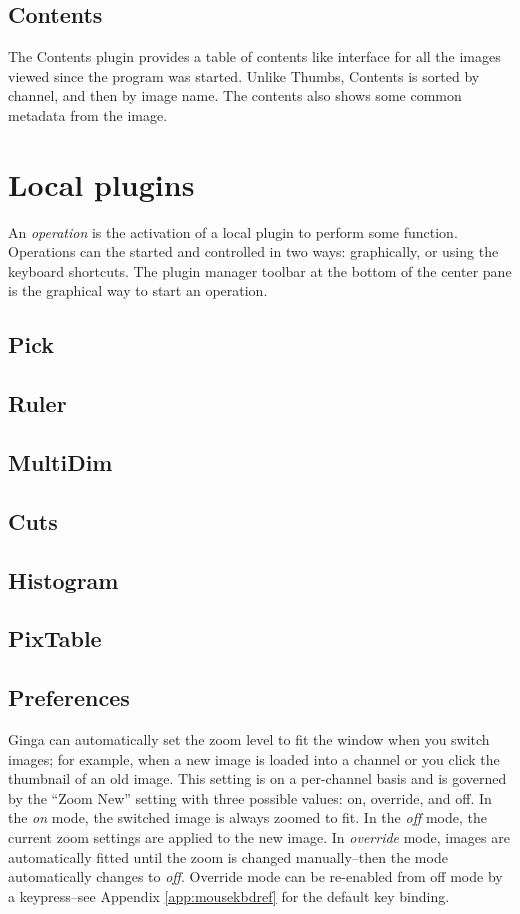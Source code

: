 \documentclass[11pt]{report}
\begin{document}
\subsection{Contents}
The Contents plugin provides a table of contents like interface for all
the images viewed since the program was started.  Unlike Thumbs,
Contents is sorted by channel, and then by image name.  The contents
also shows some common metadata from the image.

\section{Local plugins}

An {\em operation} is the activation of a local plugin to perform some
function.  Operations can the started and controlled in two ways:
graphically, or using the keyboard shortcuts.  The plugin manager
toolbar at the bottom of the center pane is the graphical way to start
an operation.  


\subsection{Pick}
\subsection{Ruler}
\subsection{MultiDim}
\subsection{Cuts}
\subsection{Histogram}
\subsection{PixTable}
\subsection{Preferences}

\label{pref:autozoom}
Ginga can automatically set the zoom level to fit the window when you
switch images; 
for example, when a new image is loaded into a channel or you click the
thumbnail of an old image.
This setting is on a per-channel basis and is governed by the ``Zoom
New'' setting with three possible values: on, override, and off.  
In the \emph{on} mode, the switched image is always zoomed to fit.  In the 
\emph{off} mode, the current zoom settings are applied to the new image.
In \emph{override} mode, images are automatically fitted until the zoom is
changed manually--then the mode automatically changes to \emph{off}.
Override mode can be re-enabled from off mode by a keypress--see
Appendix \ref{app:mousekbdref} for the default key binding.
\end{document}
